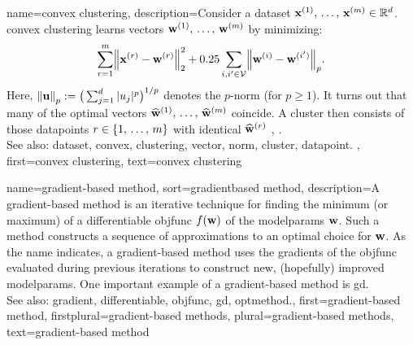 {name={convex clustering}, 
 	description={Consider a \gls{dataset} 
 		${\bf x}^{(1)}, \,\ldots, \,{\bf x}^{(m)} \in \mathbb{R}^{d}$. 
 		\Gls{convex} \gls{clustering} learns \glspl{vector} ${\bf w}^{(1)}, \,\ldots, \,{\bf w}^{(m)}$ by minimizing:
 		$$\sum_{\sampleidx=1}^{\samplesize} \normgeneric{\featurevec^{(\sampleidx)} - \weights^{(\sampleidx)}}{2}^2 + 
 		\regparam \sum_{\nodeidx,\nodeidx' \in \nodes} \normgeneric{\weights^{(\nodeidx)} - \weights^{(\nodeidx')}}{p}.$$ 
		Here, $\normgeneric{\vu}{p} \defeq \big( \sum_{\featureidx=1}^{\dimlocalmodel} |u_{\featureidx}|^{p} \big)^{1/p}$ 
		denotes the $p$-\gls{norm} (for $p\geq1$).  
		It turns out that many of the optimal \glspl{vector} $\widehat{{\bf w}}^{(1)}, \,\ldots, \,\widehat{{\bf w}}^{(m)}$ 
		coincide. A \gls{cluster} then consists of those \glspl{datapoint} $r \in \{1, \,\ldots, \,m\}$ 
		with identical $\widehat{{\bf w}}^{(r)}$ \cite{JMLR:v22:18-694}, \cite{Pelckmans2005}. 
			\\
		See also: \gls{dataset}, \gls{convex}, \gls{clustering}, \gls{vector}, \gls{norm}, \gls{cluster}, \gls{datapoint}. },
 	first={convex clustering},
	text={convex clustering} 
}

{name={gradient-based method}, 
sort={gradientbased method}, 
	description={A \gls{gradient}-based 
		method is an iterative technique for finding the \gls{minimum} (or \gls{maximum}) 
		of a \gls{differentiable} \gls{objfunc} $f({\bf w})$ of the \glspl{modelparam} ${\bf w}$. 
		Such a method constructs a \gls{sequence} of approximations to an optimal choice for ${\bf w}$. 
		As the name indicates, a \gls{gradient}-based method uses the \glspl{gradient} 
		of the \gls{objfunc} evaluated during previous \glspl{iteration} to construct new, 
		(hopefully) improved \glspl{modelparam}. One important example of a \gls{gradient}-based 
		method is \gls{gd}.
				\\
		See also: \gls{gradient}, \gls{differentiable}, \gls{objfunc}, \gls{gd}, \gls{optmethod}.},
	first={gradient-based method},
	firstplural={gradient-based methods},
	plural={gradient-based methods},
	text={gradient-based method} 
}

